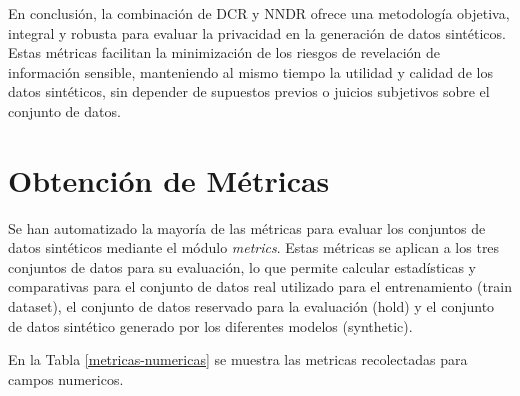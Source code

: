 En conclusión, la combinación de DCR y NNDR ofrece una metodología objetiva, integral y robusta para evaluar la privacidad en la generación de datos sintéticos. Estas métricas facilitan la minimización de los riesgos de revelación de información sensible, manteniendo al mismo tiempo la utilidad y calidad de los datos sintéticos, sin depender de supuestos previos o juicios subjetivos sobre el conjunto de datos.


\section{Obtención de Métricas}
\label{subsec:metricas}

Se han automatizado la mayoría de las métricas para evaluar los conjuntos de datos sintéticos mediante el módulo \emph{metrics}. Estas métricas se aplican a los tres conjuntos de datos para su evaluación, lo que permite calcular estadísticas y comparativas para el conjunto de datos real utilizado para el entrenamiento (train dataset), el conjunto de datos reservado para la evaluación (hold) y el conjunto de datos sintético generado por los diferentes modelos (synthetic). 

En la Tabla \ref{metricas-numericas} se muestra las metricas recolectadas para campos numericos.

